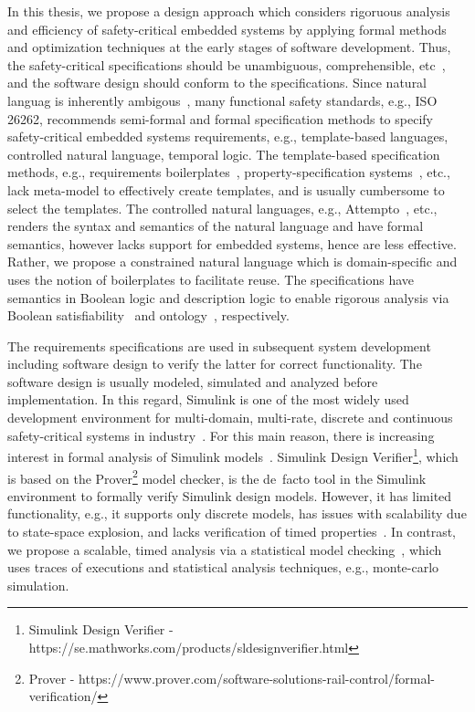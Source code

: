 In this thesis, we propose a design approach which considers rigoruous analysis and efficiency of safety-critical embedded systems by applying formal methods and optimization techniques at the early stages of software development. Thus, the safety-critical  specifications should be unambiguous, comprehensible, etc~\cite{ieereqspecstandard}, and the software design should conform to the specifications. Since natural languag is inherently ambigous~\cite{ieereqspecstandard}, many functional safety standards, e.g., ISO 26262, recommends semi-formal and formal specification methods to specify safety-critical embedded systems requirements, e.g., template-based languages, controlled natural language, temporal logic. The template-based specification methods, e.g., requirements boilerplates~\cite{Hull2011RequirementsEngineering}, property-specification systems~\cite{Dwyer1999PatternsVerificationb}, etc., lack meta-model to effectively create templates, and is usually cumbersome to select the templates. The controlled natural languages, e.g., Attempto~\cite{attempto96}\cite{Fuchs2008AttemptoRepresentation}, etc., renders the syntax and semantics of the natural language and have formal semantics, however lacks support for embedded systems, hence are less effective. Rather, we propose a constrained natural language which is domain-specific and uses the notion of boilerplates to facilitate reuse. The specifications have semantics in Boolean logic and description logic to enable rigorous analysis via Boolean satisfiability~\cite{Malik2009BooleanSuccess} and ontology~\cite{f25ea3c6f4b743cd90c150926bbcf3db}, respectively.

The requirements specifications are used in subsequent system development including software design to verify the latter for correct functionality. The software design is usually modeled, simulated and analyzed before implementation. In this regard, Simulink is one of the most widely used development environment for multi-domain, multi-rate, discrete and continuous safety-critical systems in industry~\cite{JamesB.Dabney2003MasteringSimulink}. For this main reason, there is increasing interest in formal analysis of Simulink models~\cite{Manamcheri2011AModels}. Simulink Design Verifier\footnote{Simulink Design Verifier - https://se.mathworks.com/products/sldesignverifier.html}, which is based on the Prover\footnote{Prover - https://www.prover.com/software-solutions-rail-control/formal-verification/} model checker, is the de~facto tool in the Simulink environment to formally verify Simulink design models. However, it has limited functionality, e.g., it supports only discrete models, has issues with scalability due to state-space explosion, and lacks verification of timed properties~\cite{Leitner2008SimulinkStudy}.  In contrast, we propose a scalable, timed analysis via a statistical model checking~\cite{Legay2010StatisticalOverview}, which uses traces of executions and statistical analysis techniques, e.g., monte-carlo simulation.

